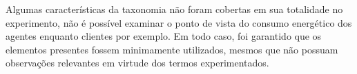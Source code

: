Algumas características da taxonomia não foram cobertas em sua totalidade no experimento, não é possível examinar o ponto de vista do consumo energético dos agentes enquanto clientes por exemplo. Em todo caso, foi garantido que os elementos presentes fossem minimamente utilizados, mesmos que não possuam observações relevantes em virtude dos termos experimentados.





 